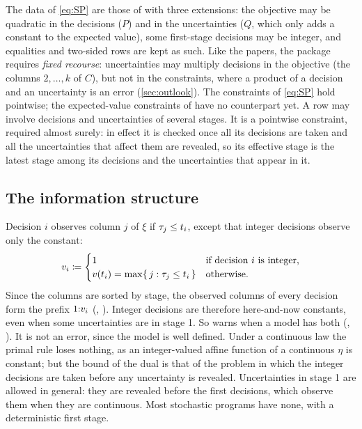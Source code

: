 The data of \eqref{eq:SP} are those of \citet[(MSP)]{KWG2011} with three extensions:
the objective may be quadratic in the decisions ($P$) and in the uncertainties ($Q$, which only adds a constant to the expected value),
some first-stage decisions may be integer,
and equalities and two-sided rows are kept as such.
Like the papers, the package requires \emph{fixed recourse}:
uncertainties may multiply decisions in the objective (the columns $2, \dots, k$ of $C$),
but not in the constraints, where a product of a decision and an uncertainty is an error (\cref{sec:outlook}).
The constraints of \eqref{eq:SP} hold pointwise;
the expected-value constraints of \citet[(MSP)]{KWG2011} have no counterpart yet.
A row may involve decisions and uncertainties of several stages.
It is a pointwise constraint, required almost surely:
in effect it is checked once all its decisions are taken and all the uncertainties that affect them are revealed,
so its effective stage is the latest stage among its decisions and the uncertainties that appear in it.

\subsection{The information structure}
\label{sec:information}

Decision $i$ observes column $j$ of $\xi$ if $\tau_j \le t_i$, except that integer decisions observe only the constant:
\[
v_i \coloneqq
\begin{cases}
1 & \text{if decision } i \text{ is integer,}\\
v(t_i) = \max\{\, j : \tau_j \le t_i \,\} & \text{otherwise.}
\end{cases}
\]
Since the columns are sorted by stage, the observed columns of every decision form the prefix $1{:}v_i$ (, ).
Integer decisions are therefore here-and-now constants, even when some uncertainties are in stage 1.
So  warns when a model has both (, ).
It is not an error, since the model is well defined.
Under a continuous law the primal rule loses nothing, as an integer-valued affine function of a continuous $\eta$ is constant;
but the bound of the dual is that of the problem in which the integer decisions are taken before any uncertainty is revealed.
Uncertainties in stage 1 are allowed in general: they are revealed before the first decisions, which observe them when they are continuous.
Most stochastic programs have none, with a deterministic first stage.

